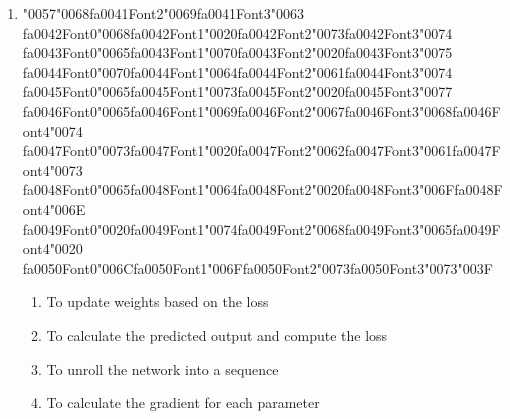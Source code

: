 \documentclass[12pt]{article}
\begin{document}
\begin{enumerate}[label=Q\arabic*.]
\begin{enumerate}[label=(\Alph*)]
    \item They cannot be trained with gradient descent
    \item They do not use activation functions
\end{enumerate}
\item {\char"0057}{\char"0068}{\csname fa0041Font2\endcsname\char"0069}{\csname fa0041Font3\endcsname\char"0063} {\csname fa0042Font0\endcsname\char"0068}{\csname fa0042Font1\endcsname\char"0020}{\csname fa0042Font2\endcsname\char"0073}{\csname fa0042Font3\endcsname\char"0074} {\csname fa0043Font0\endcsname\char"0065}{\csname fa0043Font1\endcsname\char"0070}{\csname fa0043Font2\endcsname\char"0020}{\csname fa0043Font3\endcsname\char"0075} {\csname fa0044Font0\endcsname\char"0070}{\csname fa0044Font1\endcsname\char"0064}{\csname fa0044Font2\endcsname\char"0061}{\csname fa0044Font3\endcsname\char"0074} {\csname fa0045Font0\endcsname\char"0065}{\csname fa0045Font1\endcsname\char"0073}{\csname fa0045Font2\endcsname\char"0020}{\csname fa0045Font3\endcsname\char"0077} {\csname fa0046Font0\endcsname\char"0065}{\csname fa0046Font1\endcsname\char"0069}{\csname fa0046Font2\endcsname\char"0067}{\csname fa0046Font3\endcsname\char"0068}{\csname fa0046Font4\endcsname\char"0074} {\csname fa0047Font0\endcsname\char"0073}{\csname fa0047Font1\endcsname\char"0020}{\csname fa0047Font2\endcsname\char"0062}{\csname fa0047Font3\endcsname\char"0061}{\csname fa0047Font4\endcsname\char"0073} {\csname fa0048Font0\endcsname\char"0065}{\csname fa0048Font1\endcsname\char"0064}{\csname fa0048Font2\endcsname\char"0020}{\csname fa0048Font3\endcsname\char"006F}{\csname fa0048Font4\endcsname\char"006E} {\csname fa0049Font0\endcsname\char"0020}{\csname fa0049Font1\endcsname\char"0074}{\csname fa0049Font2\endcsname\char"0068}{\csname fa0049Font3\endcsname\char"0065}{\csname fa0049Font4\endcsname\char"0020} {\csname fa0050Font0\endcsname\char"006C}{\csname fa0050Font1\endcsname\char"006F}{\csname fa0050Font2\endcsname\char"0073}{\csname fa0050Font3\endcsname\char"0073}{\char"003F}
\begin{enumerate}[label=(\Alph*)]
    \item To update weights based on the loss
    \item To calculate the predicted output and compute the loss
    \item To unroll the network into a sequence
    \item To calculate the gradient for each parameter
\end{enumerate}

\end{enumerate}
\end{document}
